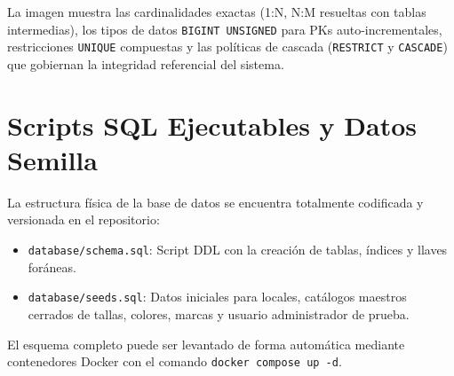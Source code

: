 La imagen muestra las cardinalidades exactas (1:N, N:M resueltas con tablas intermedias), los tipos de datos \texttt{BIGINT UNSIGNED} para PKs auto-incrementales, restricciones \texttt{UNIQUE} compuestas y las políticas de cascada (\texttt{RESTRICT} y \texttt{CASCADE}) que gobiernan la integridad referencial del sistema.

\section{Scripts SQL Ejecutables y Datos Semilla}
La estructura física de la base de datos se encuentra totalmente codificada y versionada en el repositorio:
\begin{itemize}
    \item \texttt{database/schema.sql}: Script DDL con la creación de tablas, índices y llaves foráneas.
    \item \texttt{database/seeds.sql}: Datos iniciales para locales, catálogos maestros cerrados de tallas, colores, marcas y usuario administrador de prueba.
\end{itemize}
El esquema completo puede ser levantado de forma automática mediante contenedores Docker con el comando \texttt{docker compose up -d}.
